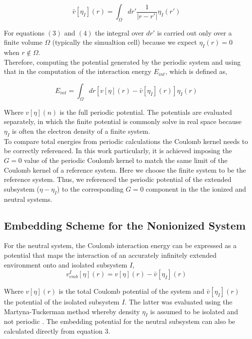 \documentclass[12pt,a4paper]{article}
\begin{document}
\begin{equation}
	\bar{v} [\eta_I](r) = \int_{\Omega} dr' \frac{1}{|r-r'|} \eta_{I}(r')
\end{equation}

For equations $(3)$ and $(4)$ the integral over $dr'$ is carried out only over a finite volume $\Omega$ (typically the simualtion cell) because we expect $\eta_{I}(r)=0$ when $r \not\in \Omega$. \\

Therefore, computing the potential generated by the periodic system and using that in the computation of the interaction energy $E_{int}$,
which is defined as,

\begin{equation}
	E_{int} = \int_{\Omega} dr [v[\eta](r)-\bar{v}[\eta_{I}](r)]\eta_{I}(r)
\end{equation}

Where $v[\eta](n)$ is the full periodic potential. The potentials are evaluated separately, in which the finite potential is commonly solve in real 
space because $\eta_{I}$ is often the electron density of a finite system. \\

To compare total energies from periodic calculations the Coulomb kernel needs to be correctly referenced. In this work particularly, it is achieved 
imposing the $G=0$ value of the periodic Coulomb kernel to match the same limit of the Coulomb kernel of a reference system. Here we choose the
finite system to be the reference system. Thus, we referenced the periodic potential of the extended subsystem ($\eta -\eta_{I}$) to the corresponding
$G=0$ component in the the ionized and neutral systems. \\

\subsection{Embedding Scheme for the Nonionized System}

For the neutral system, the Coulomb interaction energy can be expressed as a potential that maps the interaction of an accurately infinitely extended
environment onto and isolated subsystem $I$, \\

\begin{equation}
	v^{I}_{emb} [\eta] (r) = v[\eta](r) - \bar{v} [\eta_I](r)
\end{equation}

Where $v[\eta](r)$ is the total Coulomb potential of the system and $\bar{v} [\eta_I](r)$ the potential of the isolated subsystem $I$. The latter was
evaluated using the Martyna-Tuckerman method whereby density $\eta_I$ is assumed to be isolated and not periodic \cite{martyna1999reciprocal}.
The embedding potential for the neutral subsystem can also be calculated directly from equation $3$. \\
\end{document}
